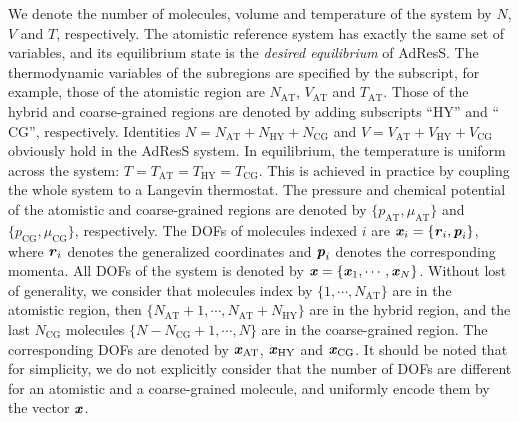 \documentclass[epjST]{svjour}
\newcommand{\redc}[1]{{\color{red} #1}}
\newcommand{\vect}[1]{\textbf{\textit{#1}}}
\newcommand{\AT}[0]{\textrm{AT}}
\newcommand{\HY}[0]{\textrm{HY}}
\newcommand{\CG}[0]{\textrm{CG}}
\newcommand{\moleidxone}[0]{i}
\begin{document}
We denote the number of molecules, volume and temperature of the system by $N$, $V$ and $T$, respectively.
The atomistic reference system has exactly the same set of variables, and its equilibrium state  is
the \emph{desired equilibrium} of AdResS.
The thermodynamic variables of the subregions are specified by the subscript,
for example, those of the atomistic region are 
$N_\AT$, $V_\AT$ and $T_\AT$. Those of the hybrid and coarse-grained regions
are denoted by adding subscripts ``$\HY$'' and ``$\CG$'', respectively.
Identities $N = N_\AT + N_\HY + N_\CG$ and $V = V_\AT + V_\HY + V_\CG$ obviously hold
in the AdResS system.
In equilibrium, the temperature is uniform across the system: $T = T_\AT = T_\HY = T_\CG$.
This is achieved in practice by coupling the whole system to a Langevin thermostat.
The pressure and chemical potential of the atomistic and coarse-grained regions
are denoted by $\{p_\AT, \mu_\AT\}$
and $\{p_\CG, \mu_\CG\}$, respectively.
The DOFs of molecules indexed $\moleidxone$ are $\vect x_\moleidxone = \{\vect r_\moleidxone, \vect p_\moleidxone\}$, where
$\vect r_\moleidxone$ denotes the generalized coordinates and $\vect p_\moleidxone$ denotes the corresponding momenta.
All DOFs of the system is denoted by $\vect x = \{\vect x_1, \cdots, \vect x_N\}$. Without lost of
generality, we consider that molecules index by $\{1, \cdots, N_\AT\}$ are in the atomistic region, then $\{N_\AT+1, \cdots, N_\AT + N_\HY\}$ are in the hybrid region, and
the last $N_\CG$ molecules $\{N-N_\CG+1, \cdots, N\}$ are in the coarse-grained region. The corresponding DOFs are denoted by $\vect x_\AT$, $\vect x_\HY$ and $\vect x_\CG$.
It should be noted that for simplicity, we do not explicitly consider that the number of DOFs are different for an atomistic
and a coarse-grained molecule, and uniformly encode them by the vector $\vect x$.

\end{document}
